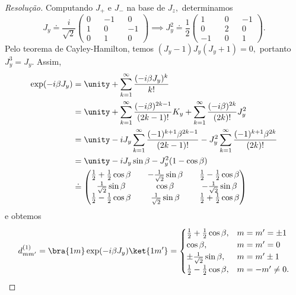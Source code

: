 \begin{proof}[Resolução]
    Computando \(J_+\) e \(J_-\) na base de \(J_z,\) determinamos
    \begin{equation*}
        J_y \doteq \frac{i}{\sqrt{2}}\begin{pmatrix}
            0 && -1 && 0\\
            1 && 0 && -1\\
            0 && 1 && 0
        \end{pmatrix}
        \implies J_y^2 \doteq \frac{1}{2} \begin{pmatrix}
            1 && 0 &&-1\\
            0 && 2 && 0\\
            -1&& 0 && 1
        \end{pmatrix}.
    \end{equation*}
    Pelo teorema de Cayley-Hamilton, temos \((J_y - 1)J_y(J_y + 1) = 0,\) portanto \(J_y^3 = J_y.\) Assim,
    \begin{align*}
        \exp(-i\beta J_y) &= \unity + \sum_{k = 1}^\infty \frac{(-i \beta J_y)^k}{k!}\\
                          &= \unity + \sum_{k = 1}^\infty \frac{(-i \beta)^{2k - 1}}{(2k - 1)!} K_y + \sum_{k = 1}^\infty \frac{(-i \beta)^{2k}}{(2 k)!}J_y^2\\
                          &= \unity - i J_y \sum_{k = 1}^\infty \frac{(-1)^{k + 1} \beta^{2 k - 1}}{(2k - 1)!} - J_y^2 \sum_{k = 1}^{\infty} \frac{(-1)^{k+1} \beta^{2k}}{(2k)!}\\
                          &= \unity - i J_y \sin \beta - J_y^2 (1 - \cos \beta)\\
                          &\doteq \begin{pmatrix}
                              \frac12 + \frac12 \cos\beta && -\frac{1}{\sqrt{2}}\sin\beta && \frac12 - \frac12 \cos\beta\\
                              \frac{1}{\sqrt{2}} \sin\beta && \cos\beta && -\frac{1}{\sqrt{2}} \sin\beta\\
                              \frac12 - \frac12 \cos\beta && \frac{1}{\sqrt{2}} \sin \beta && \frac12 + \frac12 \cos\beta\\
                          \end{pmatrix}
    \end{align*}
    e obtemos
    \begin{equation*}
        d^{(1)}_{m m'} = \bra{1m}\exp(-i \beta J_y)\ket{1m'} = \begin{cases}
            \frac12 + \frac12 \cos\beta,& m = m' = \pm 1\\
            \cos\beta,&m = m' = 0\\
            \pm \frac1{\sqrt{2}}\sin\beta, &m = m' \pm 1\\
            \frac12 - \frac12 \cos\beta,& m = -m' \neq 0.
        \end{cases}
    \end{equation*}


\end{proof}

